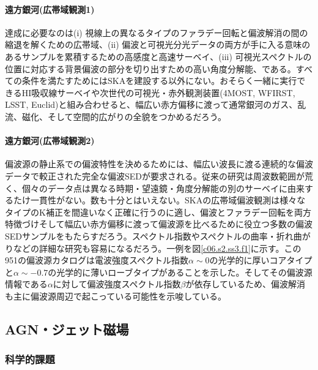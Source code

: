 \paragraph{遠方銀河(広帯域観測1)}

達成に必要なのは(i) 視線上の異なるタイプのファラデー回転と偏波解消の間の縮退を解くための広帯域、(ii) 偏波と可視光分光データの両方が手に入る意味のあるサンプルを累積するための高感度と高速サーベイ、(iii) 可視光スペクトルの位置に対応する背景偏波の部分を切り出すための高い角度分解能、である。すべての条件を満たすためにはSKAを建設する以外にない。おそらく一緒に実行できるHI吸収線サーベイや次世代の可視光・赤外観測装置(4MOST, WFIRST, LSST, Euclid)と組み合わせると、幅広い赤方偏移に渡って通常銀河のガス、乱流、磁化、そして空間的広がりの全貌をつかめるだろう。

\paragraph{遠方銀河(広帯域観測2)}

偏波源の静止系での偏波特性を決めるためには、幅広い波長に渡る連続的な偏波データで較正された完全な偏波SEDが要求される。従来の研究は周波数範囲が荒く、個々のデータ点は異なる時期・望遠鏡・角度分解能の別のサーベイに由来するたけ一貫性がない。数も十分とはいえない。SKAの広帯域偏波観測は様々なタイプのK補正を間違いなく正確に行うのに適し、偏波とファラデー回転を両方特徴づけそして幅広い赤方偏移に渡って偏波源を比べるために役立つ多数の偏波SEDサンプルをもたらすだろう。スペクトル指数やスペクトルの曲率・折れ曲がりなどの詳細な研究も容易になるだろう。一例を図\ref{c06.s2.ss3.f1}に示す。この951の偏波源カタログは電波強度スペクトル指数$\alpha\sim 0$の光学的に厚いコアタイプと$\alpha\sim -0.7$の光学的に薄いローブタイプがあることを示した。そしてその偏波源情報である$\alpha$に対して偏波強度スペクトル指数$\beta$が依存しているため、偏波解消も主に偏波源周辺で起こっている可能性を示唆している。


\subsection{AGN・ジェット磁場}
\label{c06.s2.ss4}

\subsubsection{科学的課題}
\label{c06.s2.ss4.sss1}


